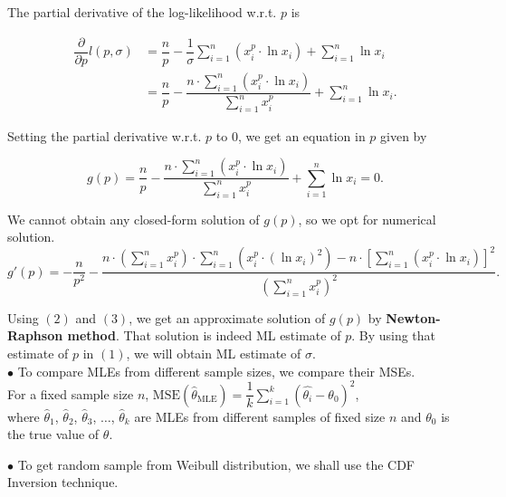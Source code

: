 \documentclass[11pt, a4paper]{article}\usepackage[]{graphicx}\usepackage[]{xcolor}
\begin{document}
The partial derivative of the log-likelihood w.r.t. $p$ is

\begin{align*}
\dfrac{\partial}{\partial p} l(p, \sigma) &= \dfrac{n}{p} - \dfrac{1}{\sigma} \sum \limits_{i = 1}^{n} (x_i^p \cdot \ln x_i) + \sum \limits_{i = 1}^{n} \ln x_i \\
&= \dfrac{n}{p} - \dfrac{n \cdot \sum \limits_{i = 1}^{n} (x_i^p \cdot \ln x_i)}{\sum \limits_{i = 1}^{n} x_i^p} + \sum \limits_{i = 1}^{n} \ln x_i.
\end{align*}

Setting the partial derivative w.r.t. $p$ to 0, we get an equation in $p$ given by

\begin{equation}
g(p) = \dfrac{n}{p} - \dfrac{n \cdot \sum \limits_{i = 1}^{n} (x_i^p \cdot \ln x_i)}{\sum \limits_{i = 1}^{n} x_i^p} + \sum \limits_{i = 1}^{n} \ln x_i = 0.
\end{equation}

We cannot obtain any closed-form solution of $g(p)$, so we opt for numerical solution. \\

\begin{equation}
g'(p) = - \dfrac{n}{p^2} - \dfrac{n \cdot \left(\sum \limits_{i = 1}^{n} x_i^p\right) \cdot \sum \limits_{i = 1}^{n} (x_i^p \cdot (\ln x_i)^2) - n \cdot  \left[ \sum \limits_{i = 1}^{n} (x_i^p \cdot \ln x_i) \right]^2}{\left(\sum \limits_{i = 1}^{n} x_i^p\right)^2}.
\end{equation}


Using $(2)$ and $(3)$, we get an approximate solution of $g(p)$ by \textbf{Newton-Raphson method}. That solution is indeed ML estimate of $p$. By using that estimate of $p$ in $(1)$, we will obtain ML estimate of $\sigma$. \\

$\bullet$ To compare MLEs from different sample sizes, we compare their MSEs. \\

For a fixed sample size $n$, $\text{MSE}(\hat{\theta}_{\text{MLE}}) = \dfrac{1}{k} \sum \limits_{i = 1}^{k} (\hat{\theta_i} - \theta_0)^2$, \\
where $\hat{\theta}_1$, $\hat{\theta}_2$, $\hat{\theta}_3$, $\ldots$, $\hat{\theta}_k$ are MLEs from different samples of fixed size $n$ and $\theta_0$ is the true value of $\theta$.

$\bullet$ To get random sample from Weibull distribution, we shall use the CDF Inversion technique. \\
\end{document}
